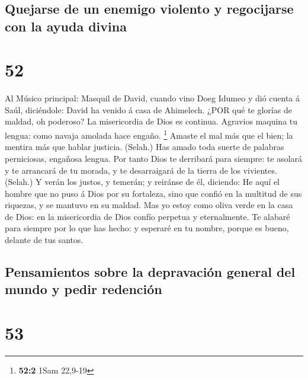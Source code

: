 \hypertarget{quejarse-de-un-enemigo-violento-y-regocijarse-con-la-ayuda-divina}{%
\subsection{Quejarse de un enemigo violento y regocijarse con la ayuda
divina}\label{quejarse-de-un-enemigo-violento-y-regocijarse-con-la-ayuda-divina}}

\hypertarget{section-51}{%
\section{52}\label{section-51}}

 Al Músico principal: Masquil de David, cuando vino Doeg
Idumeo y dió cuenta á Saúl, diciéndole: David ha venido á casa de
Ahimelech. ¿POR qué te glorías de maldad, oh poderoso? La misericordia
de Dios es continua.  Agravios maquina tu lengua: como
navaja amolada hace engaño. \footnote{\textbf{52:2} 1Sam 22,9-19}
 Amaste el mal más que el bien; la mentira más que hablar
justicia. (Selah.)  Has amado toda suerte de palabras
perniciosas, engañosa lengua.  Por tanto Dios te derribará
para siempre: te asolará y te arrancará de tu morada, y te desarraigará
de la tierra de los vivientes. (Selah.)  Y verán los justos,
y temerán; y reiránse de él, diciendo:  He aquí el hombre
que no puso á Dios por su fortaleza, sino que confió en la multitud de
sus riquezas, y se mantuvo en su maldad.  Mas yo estoy como
oliva verde en la casa de Dios: en la misericordia de Dios confío
perpetua y eternalmente.  Te alabaré para siempre por lo que
has hecho: y esperaré en tu nombre, porque es bueno, delante de tus
santos.

\hypertarget{pensamientos-sobre-la-depravaciuxf3n-general-del-mundo-y-pedir-redenciuxf3n-1}{%
\subsection{Pensamientos sobre la depravación general del mundo y pedir
redención}\label{pensamientos-sobre-la-depravaciuxf3n-general-del-mundo-y-pedir-redenciuxf3n-1}}

\hypertarget{section-52}{%
\section{53}\label{section-52}}

